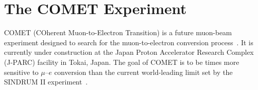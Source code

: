 \chapter{The COMET Experiment}\label{chapter2}







COMET (COherent Muon-to-Electron Transition) is a future muon-beam experiment
designed to search for the muon-to-electron conversion
process~\cite{the_comet_collaboration_comet_2020}. It is currently under
construction at the Japan Proton Accelerator Research Complex (J-PARC) facility
in Tokai, Japan. The goal of COMET is to be  times more
sensitive to $\mu$--$e$ conversion than the current world-leading limit set by
the SINDRUM II experiment~\cite{Bertl:2006up}. 

